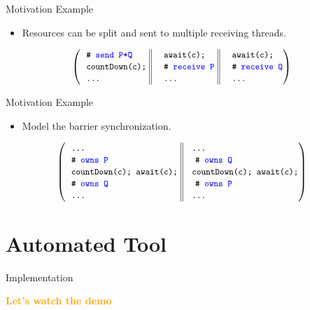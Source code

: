 \documentclass[11pt]{beamer}
\newcommand\orange[1]{\textcolor{orange}{\textbf{#1}}}
\begin{document}
\begin{frame}{Motivation Example}
  \begin{itemize}
    \item Resources can be split and sent to multiple receiving threads.
    \end{itemize}
\begin{center}
\[
{
\left(
\begin{tabular}{ l@{\extracolsep{\fill}} || 
                 l@{\extracolsep{\fill}} || 
                 l@{\extracolsep{\fill}} }
\BCOMMENT{\SPEC{send P*Q}} ~&~ \code{await(c);} ~&~ \code{await(c);}\\
\code{countDown(c);} ~&~ \BCOMMENT{\SPEC{receive P}} ~&~ \BCOMMENT{\SPEC{receive Q}}\\
\code{\ldots} ~&~ \code{\ldots} ~&~ \code{\ldots}\\
\end{tabular}\right)
}
\]
\end{center}

\end{frame}
\begin{frame}{Motivation Example}
  \begin{itemize}
    \item Model the barrier synchronization.
    \end{itemize}
\begin{center}
\[
{
\left(
\begin{tabular}{ l@{\extracolsep{\fill}}  || l@{\extracolsep{\fill}} }
\code{\ldots} ~&~\code{\ldots}\\
\BCOMMENT{\SPEC{owns P}} ~&~ \BCOMMENT{\SPEC{owns Q}}\\
\code{countDown(c);~await(c);} ~&~\code{countDown(c);~await(c);}\\
\BCOMMENT{\SPEC{owns Q}} ~&~ \BCOMMENT{\SPEC{owns P}}\\
\code{\ldots} ~&~\code{\ldots}\\
\end{tabular}\right)
}
\]
\end{center}
\end{frame}




\section{Automated Tool}
\begin{frame}{Implementation}
  \begin{center}
    \Large \orange{Let's watch the demo}
  \end{center}
\end{frame}
\end{document}
